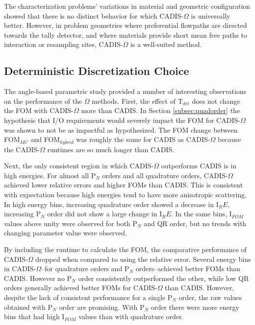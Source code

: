 The characterization problems' variations in material and geometric
configuration showed that there is no distinct behavior for which CADIS-$\Omega$
is universally better. 
However,
in problem geometries where preferential flowpaths are directed
towards the tally detector, and where materials provide short mean free paths to
interaction or resampling sites, CADIS-$\Omega$ is a well-suited method.


\subsection{Deterministic Discretization Choice}
\label{sec:deterministic_recs}

The angle-based parametric study provided a number of interesting observations on
the performance of the $\Omega$ methods.
First, the effect of T$_{det}$ does not change the FOM with CADIS-$\Omega$ more
than CADIS. In
Section \ref{subsec:quadorder} the hypothesis that I/O requirements would severely
impact the FOM for CADIS-$\Omega$ was shown to not be as impactful as
hypothesized. The FOM change between
FOM$_{MC}$ and FOM$_{hybrid}$ was roughly the same for CADIS as CADIS-$\Omega$
because the CADIS-$\Omega$ runtimes are so much longer than CADIS.

Next, the only consistent region in which CADIS-$\Omega$ outperforms CADIS is in
high energies. For almost all P$_N$ orders and all quadrature orders, CADIS-$\Omega$
achieved lower relative errors and higher FOMs than CADIS. 
This is consistent with expectation because high energies tend to have more anisotropic scattering.
In high energy bins,
increasing quadrature order showed a decrease in I$_RE$, increasing P$_N$ order
did not show a large change in I$_RE$. In the same bins, I$_{FOM}$ values above
unity were observed for both P$_N$ and QR order, but no trends with changing
parameter value were observed.

By including the runtime to calculate
the FOM, the comparative performance of CADIS-$\Omega$ dropped when compared to
using the relative error. Several
energy bins in CADIS-$\Omega$--for quadrature orders and
P$_N$ orders--achieved better FOMs than
CADIS. However no P$_N$ order consistently outperformed the other, while low
QR orders generally achieved better FOMs for CADIS-$\Omega$ than CADIS.
However, despite the lack of consistent performance for a single P$_N$ order,
the raw values obtained with P$_N$ order are promising. With P$_N$ order
there were more energy bins that had high I$_{FOM}$ values than with quadrature
order.

